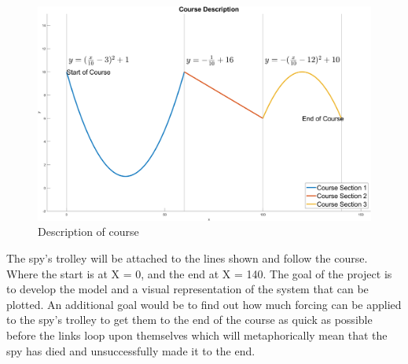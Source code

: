 \documentclass{article}
\begin{document}
\begin{figure}[H]
	\centering
	\includegraphics[scale=0.5]{course_description}	
	\caption{Description of course}
\end{figure}

The spy’s trolley will be attached to the lines shown and follow the course. Where the start is at X = 0, and the end at X = 140.
The goal of the project is to develop the model and a visual representation of the system that can be plotted. An additional goal would be to find out how much forcing can be applied to the spy’s trolley to 
get them to the end of the course as quick as possible before the links loop upon themselves which will metaphorically mean that the spy has died and unsuccessfully made it to the end. 
\end{document}

